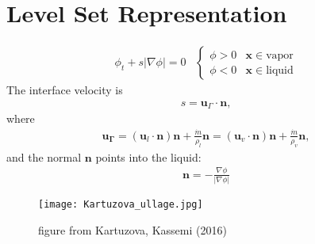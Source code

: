 \documentclass[]{article}
\begin{document}
\section*{Level Set Representation} 
\begin{minipage}[b]{0.6\textwidth}
\begin{eqnarray*}
\phi_t + s|\nabla\phi| = 0 \hspace{10pt} 
\left\{ \begin{array}{cc}
\phi>0 & \bm{x}\in\textrm{vapor} \\
\phi<0 & \bm{x}\in\textrm{liquid}
\end{array} \right.
\end{eqnarray*}
The interface velocity is 
\begin{eqnarray*}
\displaystyle s = \bm{u}_\Gamma\cdot\bm{n},
\end{eqnarray*}
where 
\begin{eqnarray*}
\bm{u_\Gamma} = 
  (\bm{u}_l\cdot\bm{n})\bm{n} +\frac{\dot{m}}{\rho_l}\bm{n} = 
  (\bm{u}_v\cdot\bm{n})\bm{n} +\frac{\dot{m}}{\rho_v}\bm{n},
\end{eqnarray*}
and the normal $\bm{n}$ points into the liquid:
\begin{eqnarray*}
\bm{n} = -\frac{\nabla\phi}{|\nabla\phi|}
\end{eqnarray*}
\end{minipage}
\begin{minipage}[b]{0.25\textwidth}
\begin{figure}[H]
\centering
\texttt{[image: Kartuzova\_ullage.jpg]}
\caption*{figure from Kartuzova, Kassemi (2016) \cite{Kartuzova2016}}
\end{figure}
\end{minipage}
	
\end{document}
